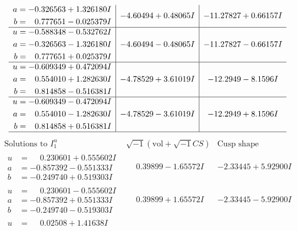 \documentclass[1p]{elsarticle_modified}
\theoremstyle{definition}
\newcommand{\I}{\sqrt{-1}}
\begin{document}
$$\begin{array}{c|c|c}
\begin{aligned}
a &= -0.326563 + 1.326180 I \\
b &= \phantom{-}0.777651 - 0.025379 I\end{aligned}
 & -4.60494 + 0.48065 I & -11.27827 + 0.66157 I \\ \hline\begin{aligned}
u &= -0.588348 - 0.532762 I \\
a &= -0.326563 - 1.326180 I \\
b &= \phantom{-}0.777651 + 0.025379 I\end{aligned}
 & -4.60494 - 0.48065 I & -11.27827 - 0.66157 I \\ \hline\begin{aligned}
u &= -0.609349 + 0.472094 I \\
a &= \phantom{-}0.554010 + 1.282630 I \\
b &= \phantom{-}0.814858 - 0.516381 I\end{aligned}
 & -4.78529 + 3.61019 I & -12.2949 - 8.1596 I \\ \hline\begin{aligned}
u &= -0.609349 - 0.472094 I \\
a &= \phantom{-}0.554010 - 1.282630 I \\
b &= \phantom{-}0.814858 + 0.516381 I\end{aligned}
 & -4.78529 - 3.61019 I & -12.2949 + 8.1596 I\\
 \hline 
 \end{array}$$\newpage$$\begin{array}{c|c|c}  
\text{Solutions to }I^u_{1}& \I (\text{vol} + \sqrt{-1}CS) & \text{Cusp shape}\\
 \hline 
\begin{aligned}
u &= \phantom{-}0.230601 + 0.555602 I \\
a &= -0.857392 - 0.551333 I \\
b &= -0.249740 + 0.519303 I\end{aligned}
 & \phantom{-}0.39899 - 1.65572 I & -2.33445 + 5.92900 I \\ \hline\begin{aligned}
u &= \phantom{-}0.230601 - 0.555602 I \\
a &= -0.857392 + 0.551333 I \\
b &= -0.249740 - 0.519303 I\end{aligned}
 & \phantom{-}0.39899 + 1.65572 I & -2.33445 - 5.92900 I \\ \hline\begin{aligned}
u &= \phantom{-}0.02508 + 1.41638 I \\

\end{aligned}
\end{array}$$
\end{document}
